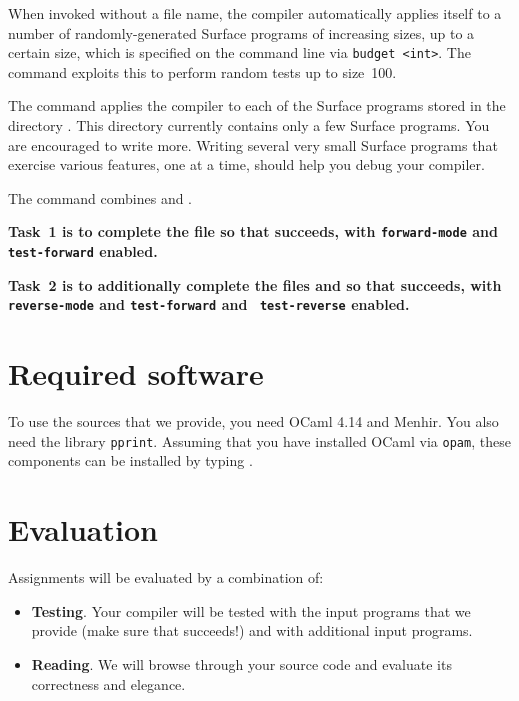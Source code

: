 \documentclass{article}
\begin{document}
When invoked without a file name, the compiler automatically applies itself to
a number of randomly-generated Surface programs of increasing sizes, up to a
certain size, which is specified on the command line via \texttt{\dash budget
  <int>}. The command  exploits this to perform random tests up
to size~100.

The command  applies the compiler to each of the Surface
programs stored in the directory . This directory
currently contains only a few Surface programs. You are encouraged to write
more. Writing several very small Surface programs that exercise various
features, one at a time, should help you debug your compiler.

The command  combines  and .

\textbf{Task~1 is to complete the file  so that  succeeds, with \texttt{\dash forward-mode} and \texttt{\dash
    test-forward} enabled.}

\textbf{Task~2 is to additionally complete the files  and
   so that  succeeds, with \texttt{\dash
    reverse-mode} and \texttt{\dash test-forward} and \texttt{\dash
    test-reverse} enabled.}


\section{Required software}

To use the sources that we provide, you need OCaml 4.14 and Menhir.
You also need the library \texttt{pprint}.
Assuming that you have installed OCaml via \texttt{opam},
these components can be installed by typing
.


\section{Evaluation}

Assignments will be evaluated by a combination of:
\begin{itemize}
\item \textbf{Testing}. Your compiler will be tested with the input programs
  that we provide (make sure that  succeeds!) and with
  additional input programs.
\item \textbf{Reading}. We will browse through your source code and evaluate
  its correctness and elegance.
\end{itemize}
\end{document}

